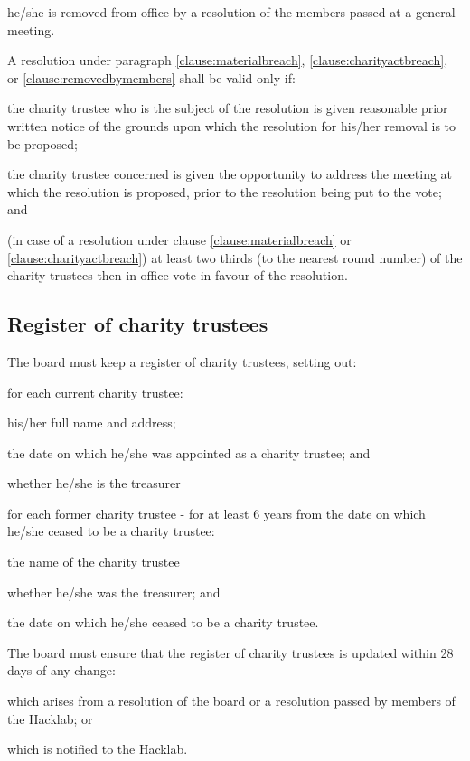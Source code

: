\documentclass{article}
\begin{document}
\subclause\label{clause:removedbymembers}he/she is removed from office by a resolution of the
members passed at a general meeting.

\clause A resolution under paragraph \ref{clause:materialbreach},
\ref{clause:charityactbreach}, or \ref{clause:removedbymembers} shall
be valid only if:

\subclause the charity trustee who is the subject of the resolution is
given reasonable prior written notice of the grounds upon which the
resolution for his/her removal is to be proposed;

\subclause the charity trustee concerned is given the opportunity to
address the meeting at which the resolution is proposed, prior to the
resolution being put to the vote; and

\subclause (in case of a resolution under clause
\ref{clause:materialbreach} or \ref{clause:charityactbreach}) at least
two thirds (to the nearest round number) of the charity trustees then
in office vote in favour of the resolution.

\subsection{Register of charity trustees}

\clause The board must keep a register of charity trustees, setting
out:

\subclause for each current charity trustee:

\subsubclause his/her full name and address;

\subsubclause the date on which he/she was appointed as a charity
trustee; and

\subsubclause whether he/she is the treasurer

\subclause for each former charity trustee - for at least 6 years from
the date on which he/she ceased to be a charity trustee:

\subsubclause the name of the charity trustee

\subsubclause whether he/she was the treasurer; and

\subsubclause the date on which he/she ceased to be a charity trustee.

\clause The board must ensure that the register of charity trustees is
updated within 28 days of any change:

\subclause which arises from a resolution of the board or a resolution
passed by members of the Hacklab; or

\subclause which is notified to the Hacklab.
\end{document}
